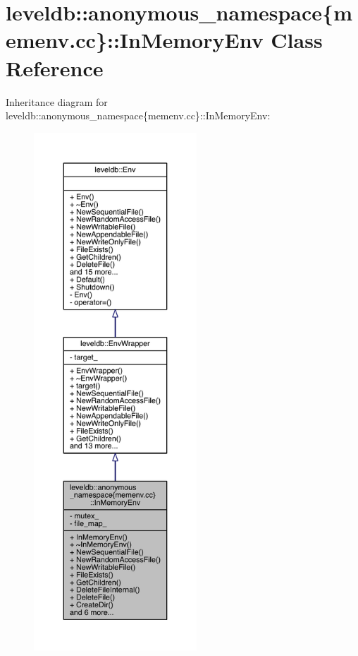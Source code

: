 \hypertarget{classleveldb_1_1anonymous__namespace_02memenv_8cc_03_1_1_in_memory_env}{}\section{leveldb\+:\+:anonymous\+\_\+namespace\{memenv.\+cc\}\+:\+:In\+Memory\+Env Class Reference}
\label{classleveldb_1_1anonymous__namespace_02memenv_8cc_03_1_1_in_memory_env}


Inheritance diagram for leveldb\+:\+:anonymous\+\_\+namespace\{memenv.\+cc\}\+:\+:In\+Memory\+Env\+:
\nopagebreak
\begin{figure}[H]
\begin{center}
\leavevmode
\includegraphics[height=550pt]{classleveldb_1_1anonymous__namespace_02memenv_8cc_03_1_1_in_memory_env__inherit__graph}
\end{center}
\end{figure}


